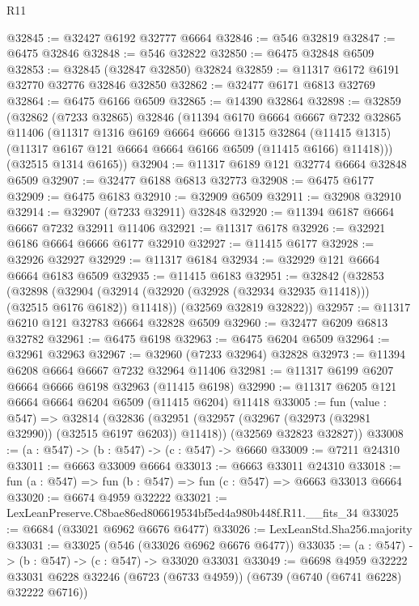 \begin{lexlean}{R11}
\begin{coremodule}
@32845 := @32427 @6192 @32777 @6664
@32846 := @546 @32819
@32847 := @6475 @32846
@32848 := @546 @32822
@32850 := @6475 @32848 @6509
@32853 := @32845 (@32847 @32850) @32824
@32859 := @11317 @6172 @6191 @32770 @32776 @32846 @32850
@32862 := @32477 @6171 @6813 @32769
@32864 := @6475 @6166 @6509
@32865 := @14390 @32864
@32898 := @32859
    (@32862
      (@7233 @32865)
      @32846
      (@11394
        @6170
        @6664
        @6667
        @7232
        @32865
        @11406
        (@11317
          @1316
          @6169
          @6664
          @6666
          @1315
          @32864
          (@11415 @1315)
          (@11317 @6167 @121 @6664 @6664 @6166 @6509 (@11415 @6166) @11418)))
      (@32515 @1314 @6165))
@32904 := @11317 @6189 @121 @32774 @6664 @32848 @6509
@32907 := @32477 @6188 @6813 @32773
@32908 := @6475 @6177
@32909 := @6475 @6183
@32910 := @32909 @6509
@32911 := @32908 @32910
@32914 := @32907 (@7233 @32911) @32848
@32920 := @11394 @6187 @6664 @6667 @7232 @32911 @11406
@32921 := @11317 @6178
@32926 := @32921 @6186 @6664 @6666 @6177 @32910
@32927 := @11415 @6177
@32928 := @32926 @32927
@32929 := @11317 @6184
@32934 := @32929 @121 @6664 @6664 @6183 @6509
@32935 := @11415 @6183
@32951 := @32842
    (@32853
      (@32898
        (@32904 (@32914 (@32920 (@32928 (@32934 @32935 @11418))) (@32515 @6176 @6182)) @11418))
      (@32569 @32819 @32822))
@32957 := @11317 @6210 @121 @32783 @6664 @32828 @6509
@32960 := @32477 @6209 @6813 @32782
@32961 := @6475 @6198
@32963 := @6475 @6204 @6509
@32964 := @32961 @32963
@32967 := @32960 (@7233 @32964) @32828
@32973 := @11394 @6208 @6664 @6667 @7232 @32964 @11406
@32981 := @11317 @6199 @6207 @6664 @6666 @6198 @32963 (@11415 @6198)
@32990 := @11317 @6205 @121 @6664 @6664 @6204 @6509 (@11415 @6204) @11418
@33005 := fun (value : @547) =>
  @32814
    (@32836
      (@32951 (@32957 (@32967 (@32973 (@32981 @32990)) (@32515 @6197 @6203)) @11418))
      (@32569 @32823 @32827))
@33008 := (a : @547) -> (b : @547) -> (c : @547) -> @6660
@33009 := @7211 @24310
@33011 := @6663 @33009 @6664
@33013 := @6663 @33011 @24310
@33018 := fun (a : @547) => fun (b : @547) => fun (c : @547) => @6663 @33013 @6664
@33020 := @6674 @4959 @32222
@33021 := LexLeanPreserve.C8bae86ed806619534bf5ed4a980b448f.R11.__fits_34
@33025 := @6684 (@33021 @6962 @6676 @6477)
@33026 := LexLeanStd.Sha256.majority
@33031 := @33025 (@546 (@33026 @6962 @6676 @6477))
@33035 := (a : @547) -> (b : @547) -> (c : @547) -> @33020 @33031
@33049 := @6698
    @4959
    @32222
    @33031
    @6228
    @32246
    (@6723 (@6733 @4959))
    (@6739 (@6740 (@6741 @6228) @32222 @6716))

\end{coremodule}
\end{lexlean}
